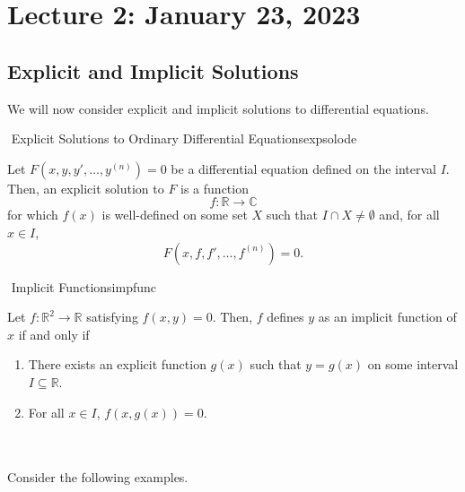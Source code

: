 \section{Lecture 2: January 23, 2023}

    \subsection{Explicit and Implicit Solutions}

        We will now consider explicit and implicit solutions to differential equations.
        \begin{definition}{\Stop\,\,Explicit Solutions to Ordinary Differential Equations}{expsolode}
            
            Let \(F(x,y,y',\ldots,y^{(n)})=0\) be a differential equation defined on the interval \(I\). Then, an explicit solution to \(F\) is a function
            \begin{equation*}
                f:\mathbb{R}\to\mathbb{C}
            \end{equation*}
            for which \(f(x)\) is well-defined on some set \(X\) such that \(I\cap X\neq\emptyset\) and, for all \(x\in I\),
            \begin{equation*}
                F(x,f,f',\ldots,f^{(n)})=0.
            \end{equation*}

        \end{definition}
        \begin{definition}{\Stop\,\,Implicit Functions}{impfunc}

            Let \(f:\mathbb{R}^2\to\mathbb{R}\) satisfying \(f(x,y)=0\). Then, \(f\) defines \(y\) as an implicit function of \(x\) if and only if
            \begin{enumerate}
                \item There exists an explicit function \(g(x)\) such that \(y=g(x)\) on some interval \(I\subseteq \mathbb{R}\).
                \item For all \(x\in I\), \(f(x,g(x))=0\).
            \end{enumerate}
            
        \end{definition}
        \vphantom
        \\
        \\
        Consider the following examples.
